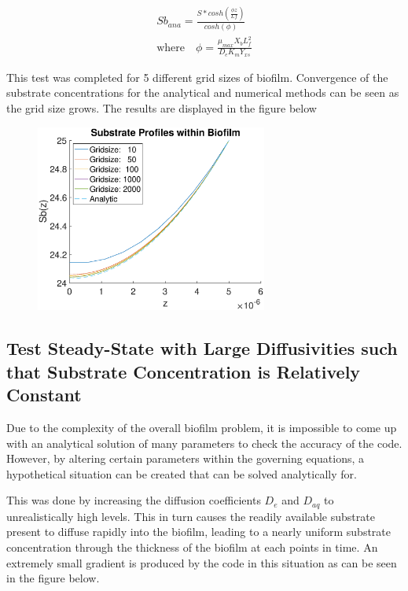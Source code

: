 \documentclass[letterpaper, twoside]{article}
\numberwithin{equation}{section}
\begin{document}
\begin{align}
{Sb_{ana}}=\frac{S*{cosh(\frac{{\phi}{z}}{Lf})}}{cosh(\phi)}\\
\text{where}{\quad} {\phi}=\frac{\mu_{max}{X_b}{L_f^{2}}}{{D_e}{K_m}{Y_{xs}}}
\end{align}

This test was completed for 5 different grid sizes of biofilm. Convergence of the substrate concentrations for the analytical and numerical methods can be seen as the grid size grows. The results are displayed in the figure below

\begin{figure}[H]
  \centering
  \includegraphics[read=eps, width=3in]{BiofilmDiffusion_Figure1.eps}
\end{figure}

\subsection{Test Steady-State with Large Diffusivities such that Substrate Concentration is Relatively Constant}

Due to the complexity of the overall biofilm problem, it is impossible to come up with an analytical solution of many parameters to check the accuracy of the code. However, by altering certain parameters within the governing equations, a hypothetical situation can be created that can be solved analytically for.

This was done by increasing the diffusion coefficients $D_e$ and $D_{aq}$ to unrealistically high levels. This in turn causes the readily available substrate present to diffuse rapidly into the biofilm, leading to a nearly uniform substrate concentration through the thickness of the biofilm at each points in time. An extremely small gradient is produced by the code in this situation as can be seen in the figure below.
\end{document}
